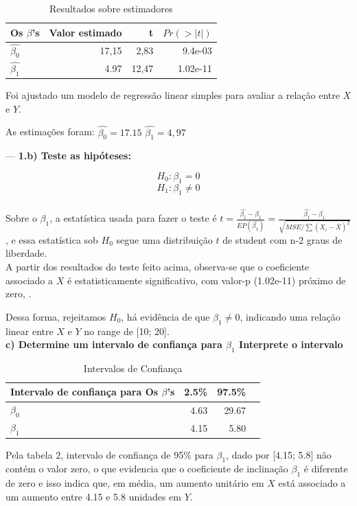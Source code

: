 \documentclass[12pt]{article}
\begin{document}
\begin{table}[htbp]
\centering
\begin{tabular}{lrrr}
\toprule
Os $\beta$'s  & Valor estimado & t  & $Pr(>|t|)$ \\
\midrule
{$\hat{\beta_0}$} & 17,15 & 2,83 & 9.4e-03 \\
{$\hat{\beta_1}$} & 4.97 & 12,47 & 1.02e-11 \\

\bottomrule
\end{tabular}
\caption{Resultados sobre estimadores}
\end{table}

Foi ajustado um modelo de regressão linear simples para avaliar a relação entre $X$ e $Y$.

As estimações foram:  $\hat{\beta_0} = 17.15 $ $\hat{\beta_1}  = 4,97$

---
\textbf{1.b) Teste as hipóteses: }

\[
H_0: \beta_1 = 0 
\]
\[
H_1: \beta_1 \neq 0
\]
\\
Sobre o $\beta_1$, a estatística usada para fazer o teste é 
$t =\frac{\hat{\beta_1} - \beta_1}{EP(\hat{\beta_1})} 
= \frac{\hat{\beta_1} - \beta_1}{\sqrt{MSE/\sum (X_i-\bar{X})^2}}$, 
e essa estatística sob $H_0$ segue uma distribuição $t$ de student com n-2 
graus de liberdade.
\\
A partir dos resultados do teste feito acima, 
observa-se que o coeficiente associado a $X$ é 
estatisticamente significativo, com valor-p (1.02e-11) 
próximo de zero, .

Dessa forma, rejeitamos $H_0$, há evidência de que $\beta_1 \neq 0$, 
indicando uma relação linear entre $X$ e $Y$ no range 
de [10; 20].
\\

\textbf{c) Determine um intervalo de 
confiança para $\beta_1$ Interprete o intervalo}
\\
\begin{table}[htbp]
\centering
\begin{tabular}{lrrr}
\toprule
Intervalo de confiança para Os $\beta$'s & 2.5\%  & 97.5\% \\
\midrule
{$\beta_0$}  & 4.63 & 29.67\\
{$\beta_1$}  & 4.15 & 5.80 \\

\bottomrule
\end{tabular}
\caption{Intervalos de Confiança}
\end{table}

Pela tabela 2, intervalo de confiança de 95\% para $\beta_1$, 
dado por [4.15; 5.8] não contém o valor zero, 
o que evidencia que o coeficiente de 
inclinação $\beta_1$ é diferente de zero e isso indica que, 
em média, um aumento unitário em $X$ 
está associado a um aumento entre 4.15 e 5.8 unidades 
em $Y$.
\end{document}
